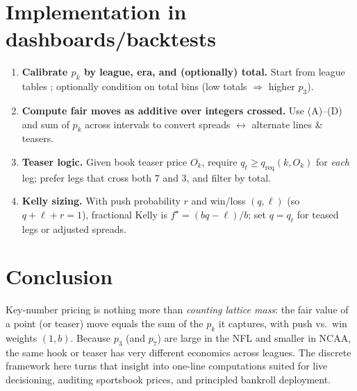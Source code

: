 \documentclass[11pt]{amsart}
\begin{document}
\section{Implementation in dashboards/backtests}
\begin{enumerate}[leftmargin=2em,label=\arabic*.]
\item \textbf{Calibrate $p_k$ by league, era, and (optionally) total.} Start from league tables \cite{CleanupHitter-NFL,CleanupHitter-CFB}; optionally condition on total bins (low totals $\Rightarrow$ higher $p_3$).
\item \textbf{Compute fair moves as additive over integers crossed.} Use (A)--(D) and sum of $p_k$ across intervals to convert spreads $\leftrightarrow$ alternate lines \& teasers.
\item \textbf{Teaser logic.} Given book teaser price $O_k$, require $q_t\ge q_{\text{req}}(k,O_k)$ for \emph{each} leg; prefer legs that cross both $7$ and $3$, and filter by total.
\item \textbf{Kelly sizing.} With push probability $r$ and win/loss $(q,\ell)$ (so $q+\ell+r=1$), fractional Kelly is $f^\star=(bq-\ell)/b$; set $q=q_t$ for teased legs or adjusted spreads.
\end{enumerate}

\section*{Conclusion}
Key-number pricing is nothing more than \emph{counting lattice mass}: the fair value of a point (or teaser) move equals the sum of the $p_k$ it captures, with push vs.\ win weights $(1,b)$. Because $p_3$ (and $p_7$) are large in the NFL and smaller in NCAA, the same hook or teaser has very different economics across leagues. The discrete framework here turns that insight into one-line computations suited for live decisioning, auditing sportsbook prices, and principled bankroll deployment.

\bigskip
\end{document}
